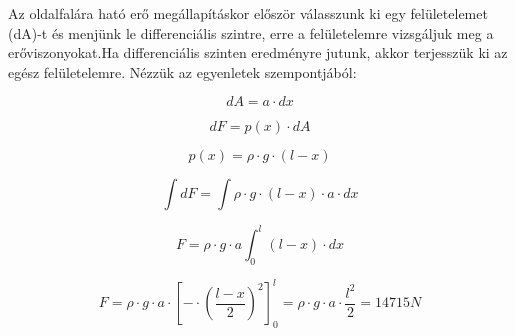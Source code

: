 \vspace{0.5cm}

\noindent Az oldalfalára ható erő megállapításkor először válasszunk ki egy felületelemet (dA)-t és menjünk le differenciális szintre, erre a felületelemre vizsgáljuk meg a erőviszonyokat.Ha differenciális szinten eredményre jutunk, akkor terjesszük ki az egész felületelemre. Nézzük az egyenletek szempontjából:

\begin{equation}
dA= a\cdot{dx} 
\end{equation}

\begin{equation}
dF= p(x)\cdot{dA}
\end{equation}

\begin{equation}
p(x)= \rho\cdot{g}\cdot{(l-x)}
\end{equation}

\begin{equation}
\int dF =\int\rho\cdot{g}\cdot{(l-x)}\cdot{a}\cdot{dx}
\end{equation}

\begin{equation}
F =\rho\cdot{g}\cdot{a}\int_{0}^l(l-x)\cdot{dx}
\end{equation}

\begin{equation}
F =\rho\cdot{g}\cdot{a}\cdot[-\cdot(\frac{l-x}{2})^2]_{0}^l =\rho\cdot{g}\cdot{a}\cdot\frac{l^2}{2}=14715N
\end{equation}


\vspace{0.5cm}
